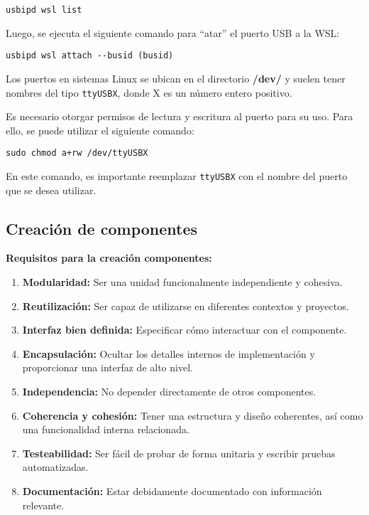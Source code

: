 \begin{verbatim}
usbipd wsl list
\end{verbatim}

Luego, se ejecuta el siguiente comando para ``atar'' el puerto USB a la WSL:

\begin{verbatim}
usbipd wsl attach --busid (busid)
\end{verbatim}

Los puertos en sistemas Linux se ubican en el directorio \textbf{/dev/} y suelen tener nombres del tipo \texttt{ttyUSBX}, donde X es un número entero positivo.



Es necesario otorgar permisos de lectura y escritura al puerto para su uso. Para ello, se puede utilizar el siguiente comando:

\begin{verbatim}
sudo chmod a+rw /dev/ttyUSBX
\end{verbatim}

En este comando, es importante reemplazar \texttt{ttyUSBX} con el nombre del puerto que se desea utilizar.

\subsection{Creación de componentes}
\label{subsection:componentcreation}

\textbf{Requisitos para la creación componentes:}
\begin{enumerate}
\item \textbf{Modularidad:} Ser una unidad funcionalmente independiente y cohesiva.
\item \textbf{Reutilización:} Ser capaz de utilizarse en diferentes contextos y proyectos.
\item \textbf{Interfaz bien definida:} Especificar cómo interactuar con el componente.
\item \textbf{Encapsulación:} Ocultar los detalles internos de implementación y proporcionar una interfaz de alto nivel.
\item \textbf{Independencia:} No depender directamente de otros componentes.
\item \textbf{Coherencia y cohesión:} Tener una estructura y diseño coherentes, así como una funcionalidad interna relacionada.
\item \textbf{Testeabilidad:} Ser fácil de probar de forma unitaria y escribir pruebas automatizadas.
\item \textbf{Documentación:} Estar debidamente documentado con información relevante.
\end{enumerate}

